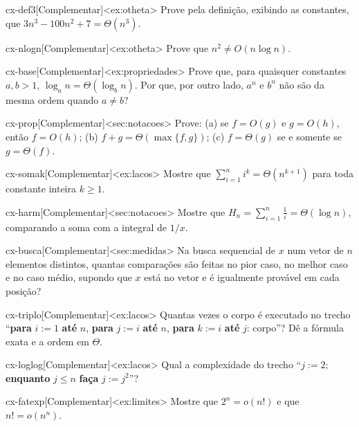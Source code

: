 \begin{exercicio}{cx-def3}[Complementar]<ex:otheta>
Prove pela definição, exibindo as constantes, que $3n^3-100n^2+7=\Theta(n^3)$.
\end{exercicio}
\begin{exercicio}{cx-nlogn}[Complementar]<ex:otheta>
Prove que $n^2\ne O(n\log n)$.
\end{exercicio}
\begin{exercicio}{cx-base}[Complementar]<ex:propriedades>
Prove que, para quaisquer constantes $a,b>1$, $\log_an=\Theta(\log_bn)$. Por que, por outro lado, $a^n$ e $b^n$ não são da mesma ordem quando $a\ne b$?
\end{exercicio}
\begin{exercicio}{cx-prop}[Complementar]<sec:notacoes>
Prove: (a) se $f=O(g)$ e $g=O(h)$, então $f=O(h)$; (b) $f+g=\Theta(\max\{f,g\})$; (c) $f=\Theta(g)$ se e somente se $g=\Theta(f)$.
\end{exercicio}
\begin{exercicio}{cx-somak}[Complementar]<ex:lacos>
Mostre que $\sum_{i=1}^ni^k=\Theta(n^{k+1})$ para toda constante inteira $k\ge1$.
\end{exercicio}
\begin{exercicio}{cx-harm}[Complementar]<sec:notacoes>
Mostre que $H_n=\sum_{i=1}^n\frac1i=\Theta(\log n)$, comparando a soma com a integral de $1/x$.
\end{exercicio}
\begin{exercicio}{cx-busca}[Complementar]<sec:medidas>
Na busca sequencial de $x$ num vetor de $n$ elementos distintos, quantas comparações são feitas no pior caso, no melhor caso e no caso médio, supondo que $x$ está no vetor e é igualmente provável em cada posição?
\end{exercicio}
\begin{exercicio}{cx-triplo}[Complementar]<ex:lacos>
Quantas vezes o corpo é executado no trecho ``\textbf{para} $i:=1$ \textbf{até} $n$, \textbf{para} $j:=i$ \textbf{até} $n$, \textbf{para} $k:=i$ \textbf{até} $j$: corpo''? Dê a fórmula exata e a ordem em $\Theta$.
\end{exercicio}
\begin{exercicio}{cx-loglog}[Complementar]<ex:lacos>
Qual a complexidade do trecho ``$j:=2$; \textbf{enquanto} $j\le n$ \textbf{faça} $j:=j^2$''?
\end{exercicio}
\begin{exercicio}{cx-fatexp}[Complementar]<ex:limites>
Mostre que $2^n=o(n!)$ e que $n!=o(n^n)$.
\end{exercicio}
